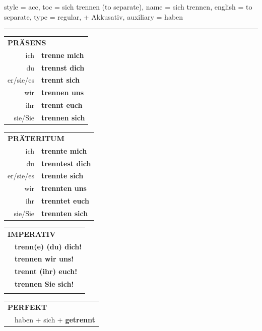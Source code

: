 \begin{verbentry}{
  style = {acc},
  toc = {sich trennen (to separate)},
  name = {sich trennen},
  english = {to separate},
  type = {regular, + Akkusativ},
  auxiliary = {haben}
}
 
    
       \vspace{5pt}

    \hrule
    
    \vspace{5pt}

  \begin{tabular}{rl}
     \multicolumn{2}{l}{\textbf{PRÄSENS} }\\
    ich & \textbf{trenne mich}\\
    du & \textbf{trennst dich}\\
    er/sie/es & \textbf{trennt sich}\\
    wir & \textbf{trennen uns}\\
    ihr & \textbf{trennt euch}\\
    sie/Sie & \textbf{trennen sich}\\
  \end{tabular}
  \hfill
     \begin{tabular}{rl}
    \multicolumn{2}{l}{\textbf{PRÄTERITUM} }\\
    ich & \textbf{trennte mich}\\
    du & \textbf{trenntest dich}\\
    er/sie/es & \textbf{trennte sich}\\
    wir & \textbf{trennten uns}\\
    ihr & \textbf{trenntet euch}\\
    sie/Sie & \textbf{trennten sich}\\
  \end{tabular}
  \hfill
  \begin{tabular}{rl}
     \multicolumn{2}{l}{\textbf{IMPERATIV} }\\
   & \textbf{trenn(e) (du) dich!}\\
   & \textbf{trennen wir uns!}\\
   & \textbf{trennt (ihr) euch!}\\
   & \textbf{trennen Sie sich!}\\
   & \vspace{10pt}
  \end{tabular}

    \vspace{10pt}

 \begin{tabular}{rl}
     \multicolumn{2}{l}{\textbf{PERFEKT}}\\
    &haben + sich + \textbf{getrennt}\\
  \end{tabular}
\hfill
   \begin{tabular}{rl}
   

\end{tabular}
\end{verbentry}
